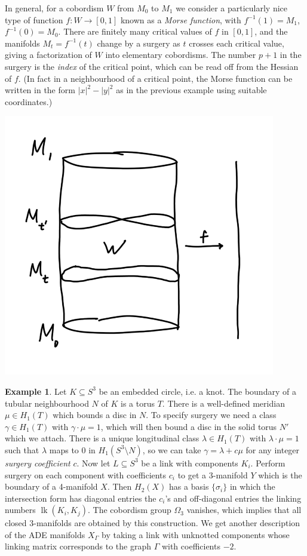 \documentclass{article}
\theoremstyle{definition}
\newtheorem*{example}{Example}
\DeclareMathOperator{\lk}{lk}
\begin{document}
In general, for a cobordism $W$ from $M_0$ to $M_1$ we consider a particularly
nice type of function $f:W\to[0,1]$ known as a \emph{Morse function}, with
$f^{-1}(1)=M_1$, $f^{-1}(0)=M_0$. There are finitely many critical values of $f$
in $[0,1]$, and the manifolds $M_t=f^{-1}(t)$ change by a surgery as $t$ crosses
each critical value, giving a factorization of $W$ into elementary cobordisms.
The number $p+1$ in the surgery is the \emph{index} of the critical point, which
can be read off from the Hessian of $f$. (In fact in a neighbourhood of a
critical point, the Morse function can be written in the form $|x|^2-|y|^2$ as
in the previous example using suitable coordinates.)
\begin{center}
    \includegraphics[scale=0.4]{manifolds_morse2}
\end{center}

\begin{example}
    Let $K\subseteq S^3$ be an embedded circle, i.e. a knot. The boundary of a
    tubular neighbourhood $N$ of $K$ is a torus $T$. There is a well-defined
    meridian $\mu\in H_1(T)$ which bounds a disc in $N$. To specify surgery we
    need a class $\gamma\in H_1(T)$ with $\gamma\cdot\mu=1$, which will then
    bound a disc in the solid torus $N'$ which we attach. There is a unique
    longitudinal class $\lambda\in H_1(T)$ with $\lambda\cdot\mu=1$ such that
    $\lambda$ maps to 0 in $H_1(S^3\setminus N)$, so we can take
    $\gamma=\lambda+c\mu$ for any integer \emph{surgery coefficient} $c$. Now
    let $L\subseteq S^3$ be a link with components $K_i$. Perform surgery on
    each component with coefficients $c_i$ to get a 3-manifold $Y$ which is the
    boundary of a 4-manifold $X$. Then $H_2(X)$ has a basis $\{\sigma_i\}$ in 
    which the intersection form has diagonal entries the $c_i$'s and
    off-diagonal entries the linking numbers $\lk(K_i,K_j)$. The cobordism group
    $\Omega_3$ vanishes, which implies that all closed 3-manifolds are obtained
    by this construction. We get another description of the ADE manifolds
    $X_\Gamma$ by taking a link with unknotted components whose linking matrix
    corresponds to the graph $\Gamma$ with coefficients $-2$.
\end{example}
\end{document}
